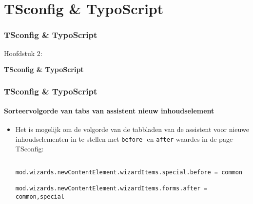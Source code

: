 %

\section{TSconfig \& TypoScript}
\begin{frame}[fragile]
	\frametitle{TSconfig \& TypoScript}

	\begin{center}\huge{Hoofdstuk 2:}\end{center}
	\begin{center}\huge{\color{typo3darkgrey}\textbf{TSconfig \& TypoScript}}\end{center}

\end{frame}

\begin{frame}[fragile]
	\frametitle{TSconfig \& TypoScript}
	\framesubtitle{Sorteervolgorde van tabs van assistent nieuw inhoudselement}

	\lstset{basicstyle=\tiny\ttfamily}

	\begin{itemize}
		\item Het is mogelijk om de volgorde van de tabbladen van de assistent voor nieuwe inhoudselementen
			in te stellen met \texttt{before}- en \texttt{after}-waardes in de page-TSconfig:

			\begin{lstlisting}
				mod.wizards.newContentElement.wizardItems.special.before = common
				mod.wizards.newContentElement.wizardItems.forms.after = common,special
			\end{lstlisting}

	\end{itemize}

\end{frame}

